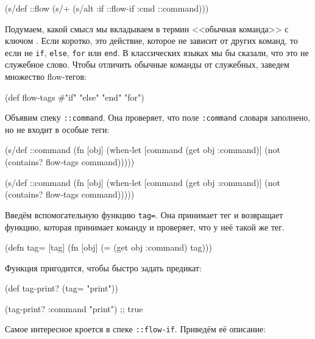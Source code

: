 \begin{clojure}
(s/def ::flow
  (s/+ (s/alt :if ::flow-if
              :cmd ::command)))
\end{clojure}


Подумаем, какой смысл мы вкладываем в термин <<обычная команда>> с ключом
. Если коротко, это действие, которое не зависит от других команд, то
если не \texttt{if}, \texttt{else}, \texttt{for} или \texttt{end}. В
классических языках мы бы сказали, что это не служебное слово. Чтобы отличить
обычные команды от служебных, заведем множество flow-тегов:

\label{flow-tags}


\begin{clojure}
(def flow-tags #{"if" "else" "end" "for"})
\end{clojure}


Объявим спеку \texttt{::command}. Она проверяет, что поле \texttt{:command}
словаря заполнено, но не входит в особые теги:

\ifnarrow


\begin{clojure}
(s/def ::command
  (fn [obj]
    (when-let [command (get obj :command)]
      (not (contains?
              flow-tags command)))))
\end{clojure}


\else


\begin{clojure}
(s/def ::command
  (fn [obj]
    (when-let [command (get obj :command)]
      (not (contains? flow-tags command)))))
\end{clojure}


\fi

Введём вспомогательную функцию \texttt{tag=}. Она принимает тег и возвращает
функцию, которая принимает команду и проверяет, что у неё такой же тег.


\begin{clojure}
(defn tag= [tag]
  (fn [obj]
    (= (get obj :command) tag)))
\end{clojure}


\noindent
Функция пригодится, чтобы быстро задать предикат:


\begin{clojure}
(def tag-print? (tag= "print"))

(tag-print? {:command "print"})
;; true
\end{clojure}


Самое интересное кроется в спеке \texttt{::flow-if}. Приведём её описание:

